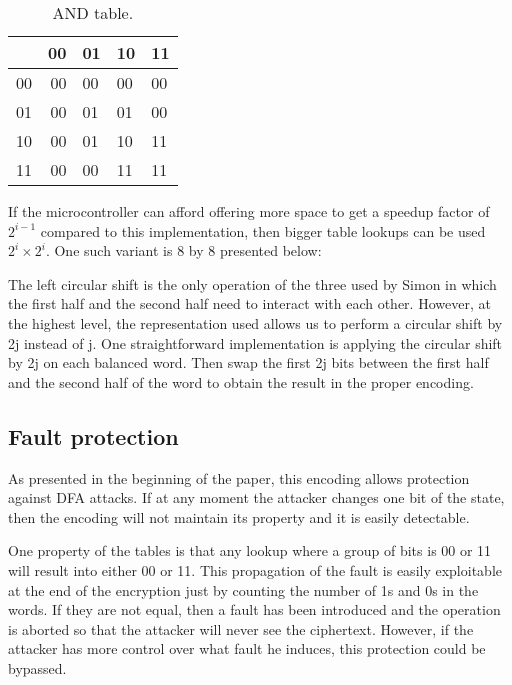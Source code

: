 \documentclass[conference]{IEEEtran}
\begin{document}
\begin{table}[htbp]
  \renewcommand{\arraystretch}{1.3}
  \caption{AND table.}
  \vspace{0.05 in}
  \label{tab:and2}
  \centering
  \begin{tabular}{r|rllp{0.5in}}
    ~ & 00 & 01 & 10 & 11 \\ \hline
    00 & 00 & 00 & 00 & 00 \\
    01 & 00 & 01 & 01 & 00 \\
    10 & 00 & 01 & 10 & 11 \\
    11 & 00 & 00 & 11 & 11 \\
  \end{tabular}
\end{table}

If the microcontroller can afford offering more space to get a speedup factor of $2^{i-1}$ compared to this implementation, then bigger table lookups can be used $2^{i} \times 2^{i}$. One such variant is 8 by 8 presented below:


The left circular shift is the only operation of the three used by Simon in which the first half and the second half need to interact with each other. However, at the highest level, the representation used allows us to perform a circular shift by 2j instead of j. One straightforward implementation is applying the circular shift by 2j on each balanced word. Then swap the first 2j bits between the first half and the second half of the word to obtain the result in the proper encoding. 

\subsection{Fault protection}

As presented in the beginning of the paper, this encoding allows protection against DFA attacks. If at any moment the attacker changes one bit of the state, then the encoding will not maintain its property and it is easily detectable.

One property of the tables is that any lookup where a group of bits is 00 or 11 will result into either 00 or 11. This propagation of the fault is easily exploitable at the end of the encryption just by counting the number of 1s and 0s in the words. If they are not equal, then a fault has been introduced and the operation is aborted so that the attacker will never see the ciphertext. However, if the attacker has more control over what fault he induces, this protection could be bypassed.
\end{document}
